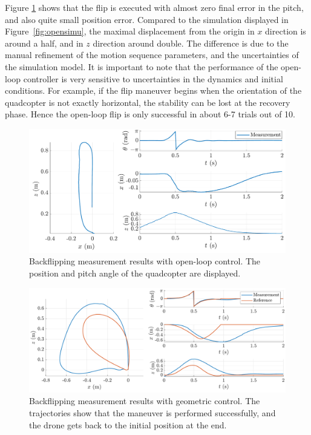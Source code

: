 Figure \ref{fig:openmeas} shows that the flip is executed with almost zero final error in the pitch, and also quite small position error. Compared to the simulation displayed in Figure~\ref{fig:opensimu}, the maximal displacement from the origin in $x$ direction is around a half, and in $z$ direction around double. The difference is due to the manual refinement of the motion sequence parameters, and the uncertainties of the simulation model. It is important to note that the performance of the open-loop controller is very sensitive to uncertainties in the dynamics and initial conditions. For example, if the flip maneuver begins when the orientation of the quadcopter is not exactly horizontal, the stability can be lost at the recovery phase. Hence the open-loop flip is only successful in about 6-7 trials out of 10.
\begin{figure}[!b]
\centering
\includegraphics[width=.8\linewidth]{Fig/openmeast.pdf}
\caption[Backflipping measurement results with open-loop control]{Backflipping measurement results with open-loop control. The position and pitch angle of the quadcopter are displayed.}\label{fig:openmeas}
\end{figure}
\newpage
\begin{figure}
\centering
\includegraphics[width=.8\linewidth]{Fig/geommeast2.pdf}
\caption[Backflipping measurement results with geometric control]{Backflipping measurement results with geometric control. The trajectories show that the maneuver is performed successfully, and the drone gets back to the initial position at the end.}\label{fig:geommeas}
\end{figure}

